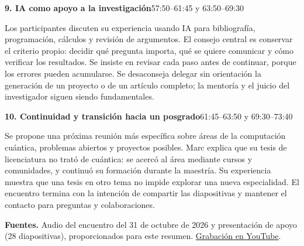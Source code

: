 \documentclass[11pt,a4paper]{article}
\newcommand{\parte}[2]{\par\addvspace{7pt}\Needspace{5\baselineskip}\noindent\textbf{#1}\hfill{\small #2}\par\nobreak}
\begin{document}
\parte{9. IA como apoyo a la investigación}{57:50--61:45 y 63:50--69:30}
Los participantes discuten su experiencia usando IA para bibliografía, programación, cálculos y revisión de argumentos. El consejo central es conservar el criterio propio: decidir qué pregunta importa, qué se quiere comunicar y cómo verificar los resultados. Se insiste en revisar cada paso antes de continuar, porque los errores pueden acumularse. Se desaconseja delegar sin orientación la generación de un proyecto o de un artículo completo; la mentoría y el juicio del investigador siguen siendo fundamentales.

\parte{10. Continuidad y transición hacia un posgrado}{61:45--63:50 y 69:30--73:40}
Se propone una próxima reunión más específica sobre áreas de la computación cuántica, problemas abiertos y proyectos posibles. Marc explica que su tesis de licenciatura no trató de cuántica: se acercó al área mediante cursos y comunidades, y continuó su formación durante la maestría. Su experiencia muestra que una tesis en otro tema no impide explorar una nueva especialidad. El encuentro termina con la intención de compartir las diapositivas y mantener el contacto para preguntas y colaboraciones.

\par\addvspace{8pt}
{\small\textbf{Fuentes.} Audio del encuentro del 31 de octubre de 2026 y presentación de apoyo (28 diapositivas), proporcionados para este resumen. \href{https://www.youtube.com/watch?v=kJAX_0uai8Y}{Grabación en YouTube}.}
\end{document}
